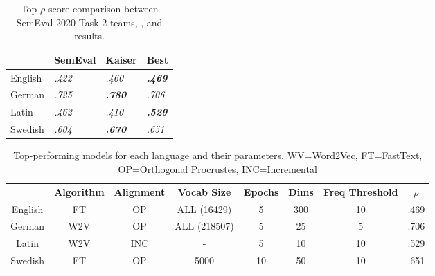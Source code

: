 \begin{table}[h]
\centering
\begin{tabular}{|l|l|l|l|} 
\cline{2-4}
\multicolumn{1}{l|}{\textbf{ }} & SemEval         & Kaiser                   & Best                      \\ 
\hline
English                         & \textit{ .422 } & \textit{ .460 }          & \textbf{\textit{ .469 }}  \\ 
\hline
German                          & \textit{ .725 } & \textit{\textbf{ .780 }} & \textit{ .706 }           \\ 
\hline
Latin                           & \textit{ .462 } & \textit{ .410 }          & \textbf{\textit{ .529 }}  \\ 
\hline
Swedish                         & \textit{ .604 } & \textit{\textbf{ .670 }} & \textit{ .651 }           \\
\hline
\end{tabular}
\caption{Top $\rho$ score comparison between SemEval-2020 Task 2 teams, \citet{kaiser-etal-2020-ims}, and results.}
\label{tab:performance-comparison}
\end{table}


\begin{table}[h]
\centering
\begin{tabular}{cccccccc} 
\toprule
\textbf{ } & \textbf{ Algorithm } & \textbf{ Alignment } & \textbf{ Vocab Size } & \textbf{ Epochs } & \textbf{ Dims } & \textbf{ Freq Threshold } & \textbf{ $\rho$ }  \\
English    & FT              & OP               & ALL (16429)      & 5                 & 300             & 10               & .469            \\
German     & W2V             & OP               & ALL (218507)     & 5                 & 25              & 5                & .706            \\
Latin      & W2V             & INC              & -                & 5                 & 10              & 10               & .529            \\
Swedish    & FT              & OP               & 5000             & 10                & 50              & 10               & .651            \\
\bottomrule
\end{tabular}
\caption{Top-performing models for each language and their parameters. WV=Word2Vec, FT=FastText, OP=Orthogonal Procrustes, INC=Incremental}
\label{tab:top-models}
\end{table}

